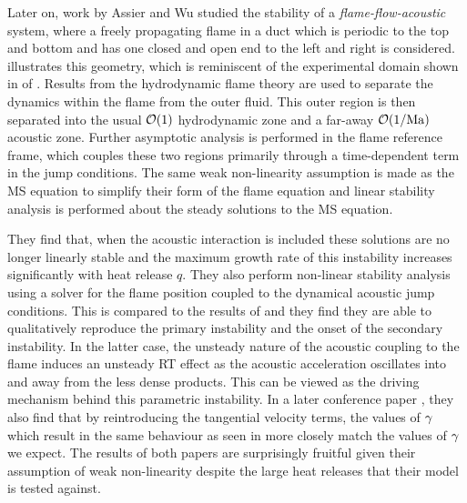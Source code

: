 Later on, work by Assier and Wu \cite{assier2014LinearWeaklyNonlinear} studied the stability of a \emph{flame-flow-acoustic} system, where a freely propagating flame in a duct which is periodic to the top and bottom and has one closed and open end to the left and right is considered.  illustrates this geometry, which is reminiscent of the experimental domain shown in  of \cite{searby1992AcousticInstabilityPremixed}. Results from the hydrodynamic flame theory \cite{matalon1982FlamesGasdynamicDiscontinuities} are used to separate the dynamics within the flame from the outer fluid. This outer region is then separated into the usual $\mathcal{O}(1)$ hydrodynamic zone and a far-away $\mathcal{O}(1/\mathrm{Ma})$ acoustic zone. Further asymptotic analysis is performed in the flame reference frame, which couples these two regions primarily through a time-dependent term in the jump conditions. The same weak non-linearity assumption is made as the MS equation to simplify their form of the flame equation and linear stability analysis is performed about the steady solutions to the MS equation.

They find that, when the acoustic interaction is included these solutions are no longer linearly stable and the maximum growth rate of this instability increases significantly with heat release $q$. They also perform non-linear stability analysis using a solver for the flame position coupled to the dynamical acoustic jump conditions. This is compared to the results of \cite{searby1992AcousticInstabilityPremixed} and they find they are able to qualitatively reproduce the primary instability and the onset of the secondary instability. In the latter case, the unsteady nature of the acoustic coupling to the flame induces an unsteady RT effect as the acoustic acceleration oscillates into and away from the less dense products. This can be viewed as the driving mechanism behind this parametric instability. In a later conference paper \cite{assier2014CombustionInstabilityModel}, they also find that by reintroducing the tangential velocity terms, the values of $\gamma$ which result in the same behaviour as seen in \cite{searby1992AcousticInstabilityPremixed} more closely match the values of $\gamma$ we expect. The results of both papers are surprisingly fruitful given their assumption of weak non-linearity despite the large heat releases that their model is tested against.


